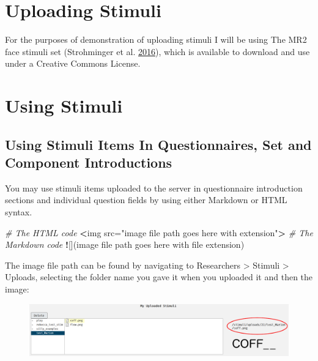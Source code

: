 \documentclass[]{book}
\newenvironment{Shaded}{\begin{snugshade}}{\end{snugshade}}
\newcommand{\StringTok}[1]{\textcolor[rgb]{0.31,0.60,0.02}{#1}}
\newcommand{\CommentTok}[1]{\textcolor[rgb]{0.56,0.35,0.01}{\textit{#1}}}
\newcommand{\OperatorTok}[1]{\textcolor[rgb]{0.81,0.36,0.00}{\textbf{#1}}}
\newcommand{\NormalTok}[1]{#1}
\begin{document}
\hypertarget{stimupload}{\section{Uploading Stimuli}\label{stimupload}}

For the purposes of demonstration of uploading stimuli I will be using
The MR2 face stimuli set (Strohminger et al.
\protect\hyperlink{ref-mr2}{2016}), which is available to download and
use under a Creative Commons License.

\section{Using Stimuli}\label{using-stimuli}

\hypertarget{htmlstim}{\subsection{Using Stimuli Items In
Questionnaires, Set and Component Introductions}\label{htmlstim}}

You may use stimuli items uploaded to the server in questionnaire
introduction sections and individual question fields by using either
Markdown or HTML syntax.

\begin{Shaded}
\begin{Highlighting}[]
\CommentTok{# The HTML code}
\OperatorTok{<}\NormalTok{img src=}\StringTok{"image file path goes here with extension"}\OperatorTok{>}
\StringTok{  }
\CommentTok{# The Markdown code}
\OperatorTok{!}\NormalTok{[](image file path goes here with file extension)}
\end{Highlighting}
\end{Shaded}

The image file path can be found by navigating to Researchers
\textgreater{} Stimuli \textgreater{} Uploads, selecting the folder name
you gave it when you uploaded it and then the image:

\begin{figure}
\centering
\includegraphics{images/screenshots/img_file_path.png}
\caption{}
\end{figure}
\end{document}
